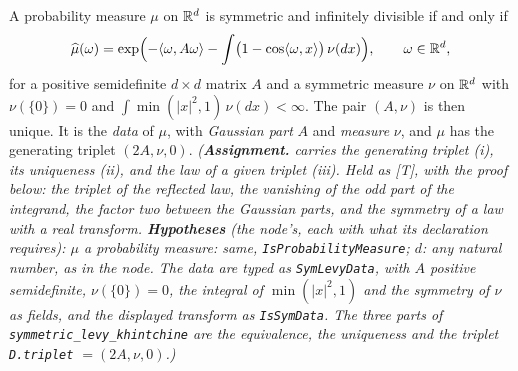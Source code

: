 \begin{lemma}
\label{lem:symmetric-levy-khintchine}
\leanok
{}
A probability measure $\mu$ on $\mathbb{R}^d$ is symmetric and infinitely divisible if and only if
\[
  \widehat\mu(\omega) = \exp\Bigl(-\langle\omega, A\omega\rangle
  - \int\bigl(1 - \cos\langle\omega, x\rangle\bigr)\,\nu(dx)\Bigr), \qquad \omega \in \mathbb{R}^d,
\]
for a positive semidefinite $d \times d$ matrix $A$ and a symmetric measure $\nu$ on $\mathbb{R}^d$ with
$\nu(\{0\}) = 0$ and $\int\min(|x|^2, 1)\,\nu(dx) < \infty$. The pair $(A, \nu)$ is then unique. It
is the \emph{\Levy{} data} of $\mu$, with \emph{Gaussian part} $A$ and \emph{\Levy{} measure} $\nu$,
and $\mu$ has the generating triplet $(2A, \nu, 0)$.
\statusA\quad{}\quad\emph{(\textbf{Assignment.}  carries the generating
triplet (i), its uniqueness (ii), and the law of a given triplet (iii). Held as [T], with the proof
below: the triplet of the reflected law, the vanishing of the odd part of the integrand, the factor
two between the Gaussian parts, and the symmetry of a law with a real transform.
\textbf{Hypotheses} (the node's, each with what its declaration requires): $\mu$ a probability
measure: same, \texttt{IsProbabilityMeasure}; $d$: any natural number, as in the node. The data are
typed as \texttt{SymLevyData}, with $A$ positive semidefinite, $\nu(\{0\}) = 0$, the integral of
$\min(|x|^2, 1)$ and the symmetry of $\nu$ as fields, and the displayed transform as
\texttt{IsSymData}. The three parts of \texttt{symmetric\_levy\_khintchine} are the equivalence,
the uniqueness and the triplet \texttt{D.triplet} $= (2A, \nu, 0)$.)}
\end{lemma}

